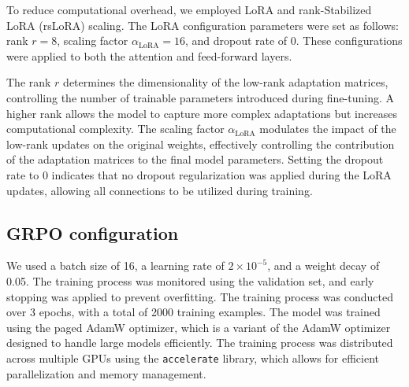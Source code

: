 To reduce computational overhead, we employed LoRA \citep{huLoRALowRankAdaptation2021} and rank-Stabilized LoRA (rsLoRA) scaling. The LoRA configuration parameters were set as follows: rank \( r = 8 \), scaling factor \( \alpha_{\text{LoRA}} = 16 \), and dropout rate of 0. These configurations were applied to both the attention and feed-forward layers.

The rank \( r \) determines the dimensionality of the low-rank adaptation matrices, controlling the number of trainable parameters introduced during fine-tuning. A higher rank allows the model to capture more complex adaptations but increases computational complexity. The scaling factor \( \alpha_{\text{LoRA}} \) modulates the impact of the low-rank updates on the original weights, effectively controlling the contribution of the adaptation matrices to the final model parameters. Setting the dropout rate to 0 indicates that no dropout regularization was applied during the LoRA updates, allowing all connections to be utilized during training.


\subsection{GRPO configuration} \label{app:grpo-config}

We used a batch size of 16, a learning rate of \(2 \times 10^{-5}\), and a weight decay of 0.05. The training process was monitored using the validation set, and early stopping was applied to prevent overfitting. The training process was conducted over 3 epochs, with a total of 2000 training examples. The model was trained using the paged AdamW optimizer, which is a variant of the AdamW optimizer designed to handle large models efficiently. The training process was distributed across multiple GPUs using the \verb|accelerate| library, which allows for efficient parallelization and memory management.
